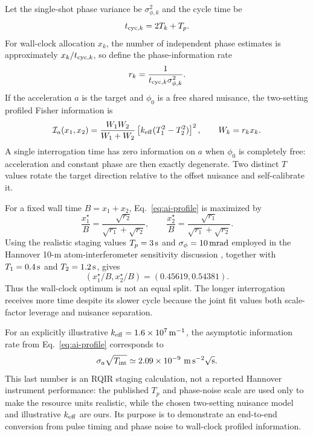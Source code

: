 Let the single-shot phase variance be $\sigma_{\phi,k}^2$ and the cycle time be
\begin{equation}
 t_{{\rm cyc},k}=2T_k+T_p.
\end{equation}
For wall-clock allocation $x_k$, the number of independent phase estimates is approximately $x_k/t_{{\rm cyc},k}$, so define the phase-information rate
\begin{equation}
 r_k=\frac{1}{t_{{\rm cyc},k}\sigma_{\phi,k}^2}.
\label{eq:ai-rate}
\end{equation}
If the acceleration $a$ is the target and $\phi_0$ is a free shared nuisance, the two-setting profiled Fisher information is
\begin{equation}
 \mathcal I_a(x_1,x_2)
 =
 \frac{W_1W_2}{W_1+W_2}
 \left[k_{\rm eff}(T_1^2-T_2^2)\right]^2,
 \qquad
 W_k=r_kx_k.
\label{eq:ai-profile}
\end{equation}
A single interrogation time has zero information on $a$ when $\phi_0$ is completely free: acceleration and constant phase are then exactly degenerate. Two distinct $T$ values rotate the target direction relative to the offset nuisance and self-calibrate it.

For a fixed wall time $B=x_1+x_2$, Eq.~\eqref{eq:ai-profile} is maximized by
\begin{equation}
 \frac{x_1^\star}{B}
 =
 \frac{\sqrt{r_2}}{\sqrt{r_1}+\sqrt{r_2}},
 \qquad
 \frac{x_2^\star}{B}
 =
 \frac{\sqrt{r_1}}{\sqrt{r_1}+\sqrt{r_2}}.
\label{eq:ai-allocation}
\end{equation}
Using the realistic staging values $T_p=3\,{\rm s}$ and
$\sigma_\phi=10\,{\rm mrad}$ employed in the Hannover 10-m atom-interferometer sensitivity discussion \cite{Schilling2020}, together with
$T_1=0.4\,{\rm s}$ and $T_2=1.2\,{\rm s}$, gives
\begin{equation}
 (x_1^\star/B,x_2^\star/B)
 =
 (0.45619,0.54381).
\end{equation}
Thus the wall-clock optimum is not an equal split. The longer interrogation receives more time despite its slower cycle because the joint fit values both scale-factor leverage and nuisance separation.

For an explicitly illustrative $k_{\rm eff}=1.6\times10^7\,{\rm m}^{-1}$, the asymptotic information rate from Eq.~\eqref{eq:ai-profile} corresponds to
\begin{equation}
 \sigma_a\sqrt{T_{\rm int}}
 \simeq 2.09\times10^{-9}\ {\rm m\,s^{-2}\sqrt{s}}.
\label{eq:ai-numeric}
\end{equation}
This last number is an RQIR staging calculation, not a reported Hannover instrument performance: the published $T_p$ and phase-noise scale are used only to make the resource units realistic, while the chosen two-setting nuisance model and illustrative $k_{\rm eff}$ are ours. Its purpose is to demonstrate an end-to-end conversion from pulse timing and phase noise to wall-clock profiled information.

